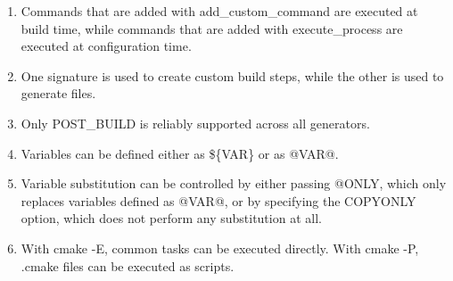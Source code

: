 

\begin{enumerate}
\item 
Commands that are added with add\_custom\_command are executed at build time, while commands that are added with execute\_process are executed at configuration time.

\item
One signature is used to create custom build steps, while the other is used to generate files.

\item 
Only POST\_BUILD is reliably supported across all generators.

\item 
Variables can be defined either as \$\{VAR\} or as @VAR@.

\item 
Variable substitution can be controlled by either passing @ONLY, which only replaces variables defined as @VAR@, or by specifying the COPYONLY option, which does not perform any substitution at all.

\item 
With cmake -E, common tasks can be executed directly. With cmake -P, .cmake files can be executed as scripts.
\end{enumerate}